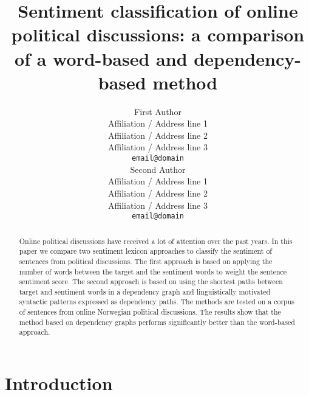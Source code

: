 \documentclass[11pt]{article}
\title{Sentiment classification of online political discussions: a comparison of a word-based and dependency-based method}
\author{First Author \\
  Affiliation / Address line 1 \\
  Affiliation / Address line 2 \\
  Affiliation / Address line 3 \\
  {\tt email@domain} \\\And
  Second Author \\
  Affiliation / Address line 1 \\
  Affiliation / Address line 2 \\
  Affiliation / Address line 3 \\
  {\tt email@domain} \\}
\date{}
\begin{document}


\maketitle
\begin{abstract}
Online political discussions have received a lot of attention over the past years. In this paper we compare two sentiment lexicon approaches to classify the sentiment of sentences from political discussions.
The first approach is based on applying the number of words between the target and the sentiment words to weight the sentence sentiment score. The second approach is based on using the shortest paths between target and sentiment words in a dependency graph and linguistically motivated syntactic patterns expressed as dependency paths. The methods are tested on a corpus of sentences from online Norwegian political discussions. The results show that the method based on dependency graphs performs significantly better than the word-based approach. 
\end{abstract}


\section{Introduction}
\label{sec:introduction}


\end{document}

